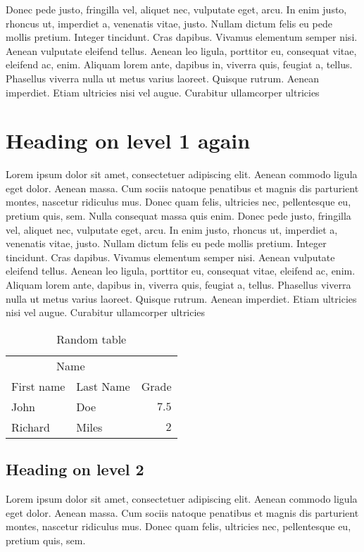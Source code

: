 \documentclass[12pt]{article}
\begin{document}
Donec pede justo, fringilla vel, aliquet nec, vulputate eget, arcu. In enim justo, rhoncus ut, imperdiet a, venenatis vitae, justo. Nullam dictum felis eu pede mollis pretium. Integer tincidunt. Cras dapibus. Vivamus elementum semper nisi. Aenean vulputate eleifend tellus. Aenean leo ligula, porttitor eu, consequat vitae, eleifend ac, enim. Aliquam lorem ante, dapibus in, viverra quis, feugiat a, tellus. Phasellus viverra nulla ut metus varius laoreet. Quisque rutrum. Aenean imperdiet. Etiam ultricies nisi vel augue. Curabitur ullamcorper ultricies 

\section*{Heading on level 1 again}
Lorem ipsum dolor sit amet, consectetuer adipiscing elit. Aenean commodo ligula eget dolor. Aenean massa. Cum sociis natoque penatibus et magnis dis parturient montes, nascetur ridiculus mus. Donec quam felis, ultricies nec, pellentesque eu, pretium quis, sem. Nulla consequat massa quis enim. Donec pede justo, fringilla vel, aliquet nec, vulputate eget, arcu. In enim justo, rhoncus ut, imperdiet a, venenatis vitae, justo. Nullam dictum felis eu pede mollis pretium. Integer tincidunt. Cras dapibus. Vivamus elementum semper nisi. Aenean vulputate eleifend tellus. Aenean leo ligula, porttitor eu, consequat vitae, eleifend ac, enim. Aliquam lorem ante, dapibus in, viverra quis, feugiat a, tellus. Phasellus viverra nulla ut metus varius laoreet. Quisque rutrum. Aenean imperdiet. Etiam ultricies nisi vel augue. Curabitur ullamcorper ultricies 

\begin{table}
\caption{Random table}
\centering
        \begin{tabular}{llr}
                \toprule
                \multicolumn{2}{c}{Name} \\
                \cmidrule(r){1-2}
                        First name & Last Name & Grade \\
                \midrule
                        John & Doe & $7.5$ \\
                        Richard & Miles & $2$ \\
                \bottomrule
        \end{tabular}
\end{table}

\subsection*{Heading on level 2}
Lorem ipsum dolor sit amet, consectetuer adipiscing elit. Aenean commodo ligula eget dolor. Aenean massa. Cum sociis natoque penatibus et magnis dis parturient montes, nascetur ridiculus mus. Donec quam felis, ultricies nec, pellentesque eu, pretium quis, sem. 
\end{document}
